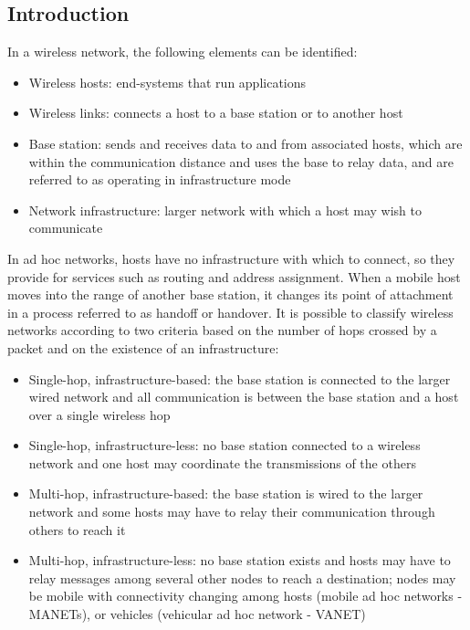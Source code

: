 \documentclass{article}
\begin{document}
\subsection{Introduction}
In a wireless network, the following elements can be identified:
\begin{itemize}
    \item Wireless hosts: end-systems that run applications
    \item Wireless links: connects a host to a base station or to another host 
    \item Base station: sends and receives data to and from associated hosts, which are within the communication distance and uses the base to relay data, and are referred to as operating in infrastructure mode
    \item Network infrastructure: larger network with which a host may wish to communicate
\end{itemize}
In ad hoc networks, hosts have no infrastructure with which to connect, so they provide for services such as routing and address assignment.
When a mobile host moves into the range of another base station, it changes its point of attachment in a process referred to as handoff or handover. 
It is possible to classify wireless networks according to two criteria based on the number of hops crossed by a packet and on the existence of an infrastructure:
\begin{itemize}
    \item Single-hop, infrastructure-based: the base station is connected to the larger wired network and all communication is between the base station and a host over a single wireless hop
    \item Single-hop, infrastructure-less: no base station connected to a wireless network and one host may coordinate the transmissions of the others
    \item Multi-hop, infrastructure-based: the base station is wired to the larger network and some hosts may have to relay their communication through others to reach it
    \item Multi-hop, infrastructure-less: no base station exists and hosts may have to relay messages among several other nodes to reach a destination; nodes may be mobile with connectivity changing among hosts (mobile ad hoc networks - MANETs), or vehicles (vehicular ad hoc network - VANET)
\end{itemize}
\end{document}
